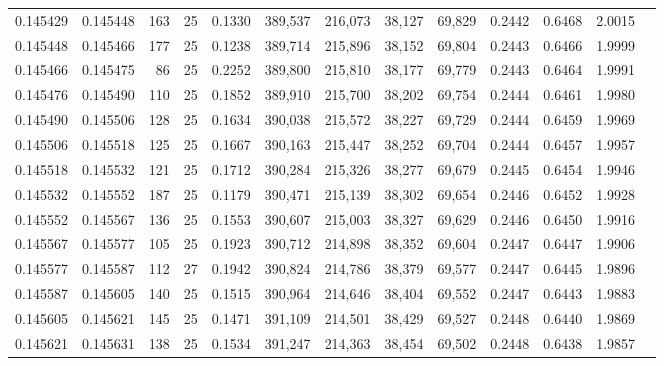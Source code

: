 \begin{tabular}{rrrrrrrrrrrrr}
0.145429 & 0.145448 &   163 &  25 &                                     0.1330 & 389,537 & 216,073 &  38,127 &  69,829 & 0.2442 & 0.6468 & 2.0015 \\
0.145448 & 0.145466 &   177 &  25 &                                     0.1238 & 389,714 & 215,896 &  38,152 &  69,804 & 0.2443 & 0.6466 & 1.9999 \\
0.145466 & 0.145475 &    86 &  25 &                                     0.2252 & 389,800 & 215,810 &  38,177 &  69,779 & 0.2443 & 0.6464 & 1.9991 \\
0.145476 & 0.145490 &   110 &  25 &                                     0.1852 & 389,910 & 215,700 &  38,202 &  69,754 & 0.2444 & 0.6461 & 1.9980 \\
0.145490 & 0.145506 &   128 &  25 &                                     0.1634 & 390,038 & 215,572 &  38,227 &  69,729 & 0.2444 & 0.6459 & 1.9969 \\
0.145506 & 0.145518 &   125 &  25 &                                     0.1667 & 390,163 & 215,447 &  38,252 &  69,704 & 0.2444 & 0.6457 & 1.9957 \\
0.145518 & 0.145532 &   121 &  25 &                                     0.1712 & 390,284 & 215,326 &  38,277 &  69,679 & 0.2445 & 0.6454 & 1.9946 \\
0.145532 & 0.145552 &   187 &  25 &                                     0.1179 & 390,471 & 215,139 &  38,302 &  69,654 & 0.2446 & 0.6452 & 1.9928 \\
0.145552 & 0.145567 &   136 &  25 &                                     0.1553 & 390,607 & 215,003 &  38,327 &  69,629 & 0.2446 & 0.6450 & 1.9916 \\
0.145567 & 0.145577 &   105 &  25 &                                     0.1923 & 390,712 & 214,898 &  38,352 &  69,604 & 0.2447 & 0.6447 & 1.9906 \\
0.145577 & 0.145587 &   112 &  27 &                                     0.1942 & 390,824 & 214,786 &  38,379 &  69,577 & 0.2447 & 0.6445 & 1.9896 \\
0.145587 & 0.145605 &   140 &  25 &                                     0.1515 & 390,964 & 214,646 &  38,404 &  69,552 & 0.2447 & 0.6443 & 1.9883 \\
0.145605 & 0.145621 &   145 &  25 &                                     0.1471 & 391,109 & 214,501 &  38,429 &  69,527 & 0.2448 & 0.6440 & 1.9869 \\
0.145621 & 0.145631 &   138 &  25 &                                     0.1534 & 391,247 & 214,363 &  38,454 &  69,502 & 0.2448 & 0.6438 & 1.9857 \\

\end{tabular}
